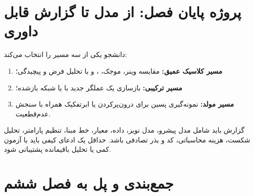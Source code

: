 \documentclass[12pt,openany,oneside]{book}
\begin{document}
\section{پروژه پایان فصل: از مدل تا گزارش قابل داوری}

دانشجو یکی از سه مسیر را انتخاب می‌کند:
\begin{enumerate}
\item \textbf{مسیر کلاسیک عمیق:} مقایسه وینر، موجک، ،  و  با تحلیل فرض و پیچیدگی؛
\item \textbf{مسیر ترکیبی:} بازسازی یک عملگر جدید با  یا شبکه بازشده؛
\item \textbf{مسیر مولد:} نمونه‌گیری پسین برای درون‌پرکردن یا ابرتفکیک همراه با سنجش عدم‌قطعیت.
\end{enumerate}
گزارش باید شامل مدل پیشرو، مدل نویز، داده، معیار، خط مبنا، تنظیم پارامتر، تحلیل شکست، هزینه محاسباتی، کد و بذر تصادفی باشد.
حداقل یک ادعای کیفی باید با آزمون کمی یا تحلیل باقیمانده پشتیبانی شود.

\section{جمع‌بندی و پل به فصل ششم}
\end{document}
